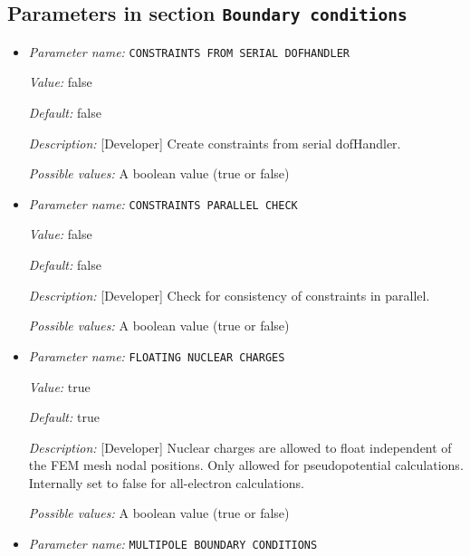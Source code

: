 \subsection{Parameters in section \tt Boundary conditions}
\label{parameters:Boundary_20conditions}

\begin{itemize}
\item {\it Parameter name:} {\tt CONSTRAINTS FROM SERIAL DOFHANDLER}
\label{parameters:Boundary conditions/CONSTRAINTS FROM SERIAL DOFHANDLER}
\label{parameters:Boundary_20conditions/CONSTRAINTS_20FROM_20SERIAL_20DOFHANDLER}


{\it Value:} false


{\it Default:} false


{\it Description:} [Developer] Create constraints from serial dofHandler.


{\it Possible values:} A boolean value (true or false)
\item {\it Parameter name:} {\tt CONSTRAINTS PARALLEL CHECK}
\label{parameters:Boundary conditions/CONSTRAINTS PARALLEL CHECK}
\label{parameters:Boundary_20conditions/CONSTRAINTS_20PARALLEL_20CHECK}


{\it Value:} false


{\it Default:} false


{\it Description:} [Developer] Check for consistency of constraints in parallel.


{\it Possible values:} A boolean value (true or false)
\item {\it Parameter name:} {\tt FLOATING NUCLEAR CHARGES}
\label{parameters:Boundary conditions/FLOATING NUCLEAR CHARGES}
\label{parameters:Boundary_20conditions/FLOATING_20NUCLEAR_20CHARGES}


{\it Value:} true


{\it Default:} true


{\it Description:} [Developer] Nuclear charges are allowed to float independent of the FEM mesh nodal positions. Only allowed for pseudopotential calculations. Internally set to false for all-electron calculations.


{\it Possible values:} A boolean value (true or false)
\item {\it Parameter name:} {\tt MULTIPOLE BOUNDARY CONDITIONS}
\label{parameters:Boundary conditions/MULTIPOLE BOUNDARY CONDITIONS}
\label{parameters:Boundary_20conditions/MULTIPOLE_20BOUNDARY_20CONDITIONS}



\end{itemize}
